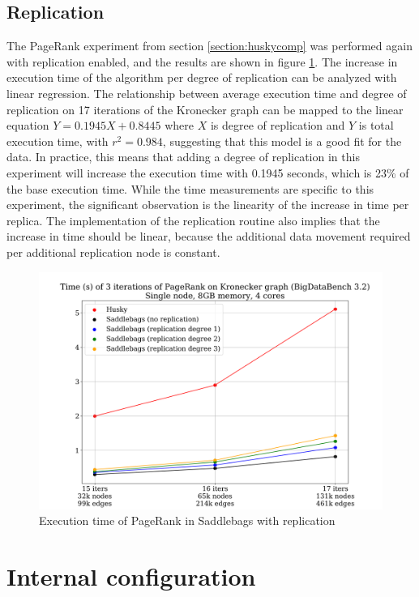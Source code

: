 \documentclass{uit-report}
\begin{document}
\subsection{Replication}\label{section:replicationeval}
The PageRank experiment from section \ref{section:huskycomp} was performed again with replication enabled, and the results are shown in figure \ref{fig:huskyfaulttolerance}.
The increase in execution time of the algorithm per degree of replication can be analyzed with linear regression. The relationship between average execution time and degree of replication on 17 iterations of the Kronecker graph can be mapped to the linear equation $Y = 0.1945X + 0.8445$ where $X$ is degree of replication and $Y$ is total execution time, with $r^2 = 0.984$, suggesting that this model is a good fit for the data. In practice, this means that adding a degree of replication in this experiment will increase the execution time with 0.1945 seconds, which is 23\% of the base execution time. While the time measurements are specific to this experiment, the significant observation is the linearity of the increase in time per replica. The implementation of the replication routine also implies that the increase in time should be linear, because the additional data movement required per additional replication node is constant.
\vskip 0.5cm
\begin{figure}[H]
	\centering
	\includegraphics[width=15cm]{illustrations/png/replication.png}
	\caption{Execution time of PageRank in Saddlebags with replication}
	\label{fig:huskyfaulttolerance}
\end{figure}

\newpage
\section{Internal configuration} \label{section:configuration}
\end{document}
